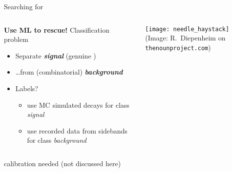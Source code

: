 \begin{frame}{Searching for \decay{\Lb/\Xibz}{\Dz\Lz}}
    \begin{columns}
        \begin{column}{.6\textwidth}
            \textbf{Use ML to rescue!} Classification problem
            \begin{itemize}
                \item Separate \textit{\textbf{signal}} (genuine \decay{\Lb/\Xibz}{\Dz\Lz})
                \item \ldots from (combinatorial) \textit{\textbf{background}}
                \item Labels?
                \begin{itemize}
                    \item use MC simulated decays for class \textit{signal}\ftntdagger{}
                    \item use recorded data from sidebands for class \textit{background}
                \end{itemize}
            \end{itemize}
        \end{column}
        \begin{column}{.4\textwidth}
            \centering
            \texttt{[image: needle\_haystack]}\\
            {\tiny (Image: R.~Diepenheim on \texttt{thenounproject.com})}
        \end{column}
    \end{columns}

    \vspace{5mm}

    \footnotesize \ftntdagger{} calibration needed (not discussed here)
\end{frame}

